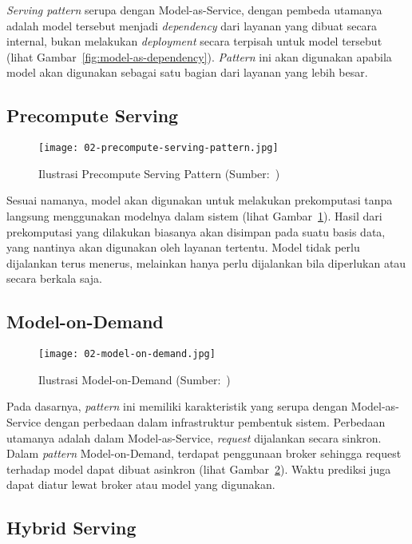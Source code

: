 \textit{Serving pattern} serupa dengan Model-as-Service, dengan pembeda utamanya adalah model tersebut menjadi \textit{dependency} dari layanan yang dibuat secara internal, bukan melakukan \textit{deployment} secara terpisah untuk model tersebut (lihat Gambar~\ref{fig:model-as-dependency}).
\textit{Pattern} ini akan digunakan apabila model akan digunakan sebagai satu bagian dari layanan yang lebih besar.

\subsection{Precompute Serving}

\begin{figure}[ht]
  \centering
  \texttt{[image: 02-precompute-serving-pattern.jpg]}
  \caption{Ilustrasi Precompute Serving Pattern (Sumber:~\cite{book-handsonml})}\label{fig:precompute-serving}
\end{figure}

Sesuai namanya, model akan digunakan untuk melakukan prekomputasi tanpa langsung menggunakan modelnya dalam sistem (lihat Gambar~\ref{fig:precompute-serving}).
Hasil dari prekomputasi yang dilakukan biasanya akan disimpan pada suatu basis data, yang nantinya akan digunakan oleh layanan tertentu.
Model tidak perlu dijalankan terus menerus, melainkan hanya perlu dijalankan bila diperlukan atau secara berkala saja.

\subsection{Model-on-Demand}

\begin{figure}[ht]
  \centering
  \texttt{[image: 02-model-on-demand.jpg]}
  \caption{Ilustrasi Model-on-Demand (Sumber:~\cite{book-handsonml})}\label{fig:model-on-demand}
\end{figure}

Pada dasarnya, \textit{pattern} ini memiliki karakteristik yang serupa dengan Model-as-Service dengan perbedaan dalam infrastruktur pembentuk sistem.
Perbedaan utamanya adalah dalam Model-as-Service, \textit{request} dijalankan secara sinkron.
Dalam \textit{pattern} Model-on-Demand, terdapat penggunaan broker sehingga request terhadap model dapat dibuat asinkron (lihat Gambar~\ref{fig:model-on-demand}).
Waktu prediksi juga dapat diatur lewat broker atau model yang digunakan.

\subsection{Hybrid Serving}

